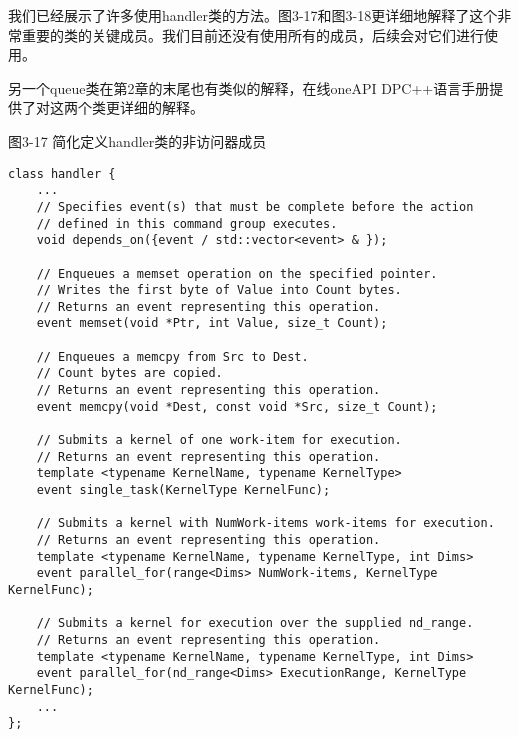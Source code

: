 我们已经展示了许多使用handler类的方法。图3-17和图3-18更详细地解释了这个非常重要的类的关键成员。我们目前还没有使用所有的成员，后续会对它们进行使用。\par

另一个queue类在第2章的末尾也有类似的解释，在线oneAPI DPC++语言手册提供了对这两个类更详细的解释。\par

\hspace*{\fill} \par %
图3-17 简化定义handler类的非访问器成员
\begin{lstlisting}[caption={}]
class handler {
	...
	// Specifies event(s) that must be complete before the action
	// defined in this command group executes.
	void depends_on({event / std::vector<event> & });
	
	// Enqueues a memset operation on the specified pointer.
	// Writes the first byte of Value into Count bytes.
	// Returns an event representing this operation.
	event memset(void *Ptr, int Value, size_t Count);
	
	// Enqueues a memcpy from Src to Dest.
	// Count bytes are copied.
	// Returns an event representing this operation.
	event memcpy(void *Dest, const void *Src, size_t Count);
	
	// Submits a kernel of one work-item for execution.
	// Returns an event representing this operation.
	template <typename KernelName, typename KernelType>
	event single_task(KernelType KernelFunc);
	
	// Submits a kernel with NumWork-items work-items for execution.
	// Returns an event representing this operation.
	template <typename KernelName, typename KernelType, int Dims>
	event parallel_for(range<Dims> NumWork-items, KernelType KernelFunc);
	
	// Submits a kernel for execution over the supplied nd_range.
	// Returns an event representing this operation.
	template <typename KernelName, typename KernelType, int Dims>
	event parallel_for(nd_range<Dims> ExecutionRange, KernelType KernelFunc);
	...
};
\end{lstlisting}


